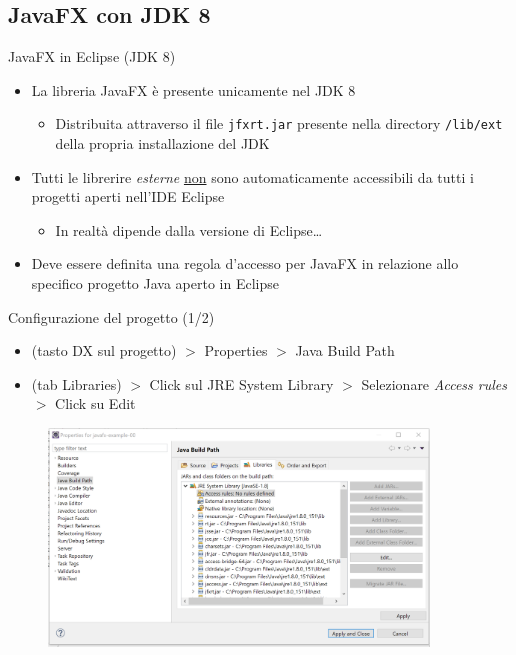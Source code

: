\documentclass[presentation]{beamer}
\begin{document}
\subsection{JavaFX con JDK 8}

\begin{frame}{JavaFX in Eclipse (JDK 8)}
\begin{itemize}\itemsep20pt
\item La libreria JavaFX è presente unicamente nel JDK 8
\begin{itemize}
\item Distribuita attraverso il file \texttt{jfxrt.jar} presente nella directory \texttt{/lib/ext} della propria installazione del JDK
\end{itemize}
\item Tutti le librerire \emph{esterne} \underline{non} sono automaticamente accessibili da tutti i progetti aperti nell'IDE Eclipse
\begin{itemize}
\item In realtà dipende dalla versione di Eclipse\dots
\end{itemize}
\item Deve essere definita una regola d'accesso per JavaFX in relazione allo specifico progetto Java aperto in Eclipse
\end{itemize}
\end{frame}

\begin{frame}{Configurazione del progetto (1/2)}
\begin{itemize}
\item (tasto DX sul progetto) $>$ Properties $>$ Java Build Path
\item (tab Libraries) $>$ Click sul JRE System Library $>$ Selezionare \textit{Access rules} $>$ Click su Edit
\end{itemize}
\begin{figure}
\includegraphics[width=0.9\textwidth]{img/conf01.png}
\end{figure}
\end{frame}
\end{document}
